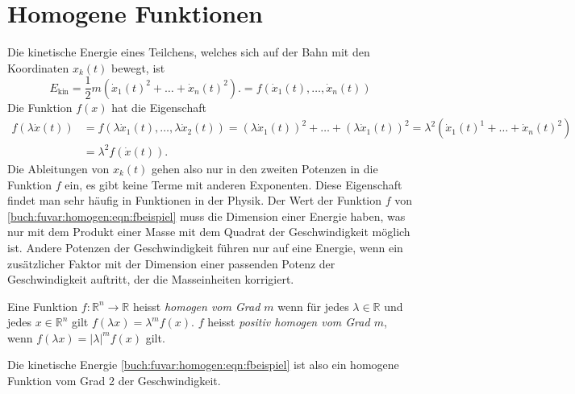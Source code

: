 %
%
%
\section{Homogene Funktionen
\label{buch:fuvar:section:homogen}}
Die kinetische Energie eines Teilchens, welches sich auf der 
Bahn mit den Koordinaten $x_k(t)$ bewegt, ist
\begin{equation}
E_{\text{kin}}
=
\frac12 m (\dot{x}_1(t)^2 + \dots + \dot{x}_n(t)^2).
=
f(\dot{x}_1(t),\dots,\dot{x}_n(t))
\label{buch:fuvar:homogen:eqn:fbeispiel}
\end{equation}
Die Funktion $f(x)$ hat die Eigenschaft
\begin{align*}
f(\lambda \dot{x}(t))
&=
f(\lambda \dot{x}_1(t),\dots,\lambda\dot{x}_2(t))
=
(\lambda\dot{x}_1(t))^2
+\ldots+
(\lambda\dot{x}_1(t))^2
=
\lambda^2(\dot{x}_1(t)^1+\ldots+\dot{x}_n(t)^2)
\\
&=
\lambda^2f(\dot{x}(t)).
\end{align*}
Die Ableitungen von $x_k(t)$ gehen also nur in den zweiten Potenzen
in die Funktion $f$ ein, es gibt keine Terme mit anderen Exponenten.
Diese Eigenschaft findet man sehr häufig in Funktionen in der Physik.
Der Wert der Funktion $f$ von \eqref{buch:fuvar:homogen:eqn:fbeispiel}
muss die Dimension einer Energie haben, was nur mit dem Produkt einer
Masse mit dem Quadrat der Geschwindigkeit möglich ist.
Andere Potenzen der Geschwindigkeit führen nur auf eine Energie, wenn
ein zusätzlicher Faktor mit der Dimension einer passenden Potenz der
Geschwindigkeit auftritt, der die Masseinheiten korrigiert.

\begin{definition}
Eine Funktion $f\colon \mathbb{R}^n\to\mathbb{R}$ heisst {\em homogen
vom Grad $m$} wenn für jedes $\lambda\in\mathbb{R}$ und jedes
$x\in\mathbb{R}^n$ gilt $f(\lambda x) = \lambda^m f(x)$.
$f$ heisst {\em positiv homogen vom Grad $m$}, wenn
$f(\lambda x) = |\lambda|^m f(x)$ gilt.
\end{definition}

Die kinetische Energie \eqref{buch:fuvar:homogen:eqn:fbeispiel} ist
also ein homogene Funktion vom Grad 2 der Geschwindigkeit.

